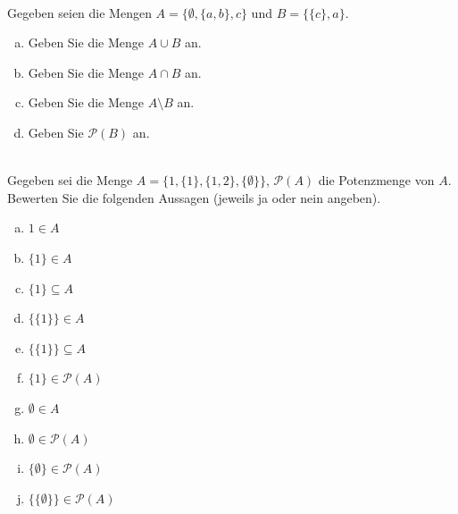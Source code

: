 \newcommand{\printpraesenzlsg}{false}
\newcommand{\printloesungen}{false}
\newcommand{\printbewertungen}{false}
\newcommand{\blattnummer}{1}

\usepackage{booktabs}



\iforiginal{}
\\
Gegeben seien die Mengen $A=\{\emptyset,\{a,b\},c\}$ und $B=\{\{c\},a\}$.
\begin{enumerate}[(a)]
\item Geben Sie die Menge $A\cup B$ an.
\item Geben Sie die Menge $A\cap B$ an.
\item Geben Sie die Menge $A\setminus B$ an.
\item Geben Sie $\mathscr{P}(B)$ an.

\end{enumerate}

\\
Gegeben sei die Menge $A=\{1,\{1\},\{1,2\},\{\emptyset\}\}$, $\mathscr{P}(A)$ die Potenzmenge von $A$. Bewerten Sie die folgenden Aussagen (jeweils ja oder nein angeben).
\begin{enumerate}[(a)]
\item $1\in A$
\item $\{1\}\in A$
\item $\{1\}\subseteq A$
\item $\{\{1\}\}\in A$
\item $\{\{1\}\}\subseteq A$
\item $\{1\}\in\mathscr{P}(A)$
\item $\emptyset\in A$
\item $\emptyset\in\mathscr{P}(A)$
\item $\{\emptyset\}\in\mathscr{P}(A)$
\item $\{\{\emptyset\}\}\in\mathscr{P}(A)$

\end{enumerate}

